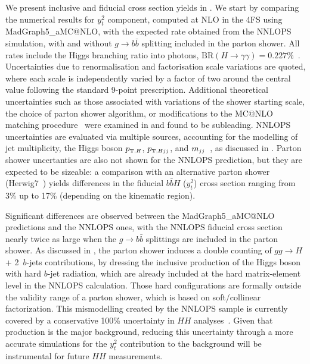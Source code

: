 \documentclass[11pt,a4paper]{article}
\begin{document}
We present inclusive and fiducial cross section yields in .
We start by comparing the numerical results for \bbH{} $y_t^2$ component, computed at NLO in the 4FS using {\sc MadGraph5\_aMC@NLO}, with the 
expected rate obtained from the {\sc NNLOPS} simulation, with and without $g\rightarrow b\bar{b}$ splitting included in the parton shower. 
All rates include the Higgs branching ratio into photons, $\textrm{BR}(H \to \gamma\gamma) = 0.227\%$~\cite{LHCHiggsCrossSectionWorkingGroup:2016ypw}. 
Uncertainties due to renormalisation and factorisation scale variations are quoted, where each scale is independently varied by a factor of two around the 
central value following the standard 9-point prescription. Additional theoretical uncertainties such as those associated with variations of the shower starting scale, 
the choice of parton shower algorithm, or modifications to the MC@NLO matching procedure~\cite{frixione:2002ik,frederix:2020trv} were examined 
in  and found to be subleading. 
{\sc NNLOPS} uncertainties are evaluated via multiple sources, accounting for the modelling of jet multiplicity, the Higgs boson $\ptH$, $\ptHjj$, and $\mjj$~\cite{deFlorian:2016spz,Liu:2013hba,stewart:2013faa,Boughezal:2013oha,Stewart:2011cf,Gangal:2013nxa}, as discussed in . Parton shower uncertanties are also not shown for the {\sc NNLOPS} prediction, but they are expected to be sizeable: a comparison with an alternative parton shower ({\sc Herwig7}~\cite{Bellm:2015jjp}) yields differences in the fiducial $b\bar{b}H$ ($y_t^2$) cross section ranging from 3\% up to 17\% (depending on the kinematic region).


Significant differences are observed between the {\sc MadGraph5\_aMC@NLO} predictions and 
the {\sc NNLOPS} ones, with the {\sc NNLOPS} fiducial cross section nearly twice as large when 
the  $g\rightarrow b\bar{b}$ splittings are included in the parton shower. 
As discussed in , the parton shower induces a double counting of 
$gg\to H$ + 2~$b$-jets contributions, by dressing the inclusive production of the Higgs boson with hard $b$-jet
radiation, which are already included at the hard matrix-element level in the {\sc NNLOPS} calculation. 
Those hard configurations are formally outside the validity range of a parton shower, which is based on soft/collinear
factorization. This mismodelling created by the {\sc NNLOPS} sample is currently covered by a 
conservative 100\% uncertainty in $HH$ analyses~\cite{HDBS-2021-10,ATLAS:2025hhd}. Given
that \bbH{} production is the major background, reducing this uncertainty through a more
accurate simulations for the $y_t^2$ contribution to the \bbH{} background will be 
instrumental for future $HH$ measurements.
\end{document}
